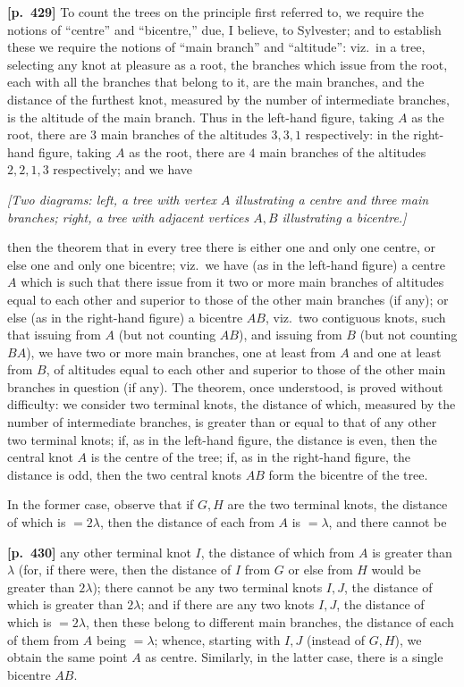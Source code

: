 \documentclass[11pt,a4paper]{article}
\begin{document}
\bigskip
\noindent\textbf{[p.~429]}\quad
To count the trees on the principle first referred to, we require the notions of ``centre'' and ``bicentre,'' due, I believe, to Sylvester; and to establish these we require the notions of ``main branch'' and ``altitude'': viz.\ in a tree, selecting any knot at pleasure as a root, the branches which issue from the root, each with all the branches that belong to it, are the main branches, and the distance of the furthest knot, measured by the number of intermediate branches, is the altitude of the main branch. Thus in the left-hand figure, taking $A$ as the root, there are $3$ main branches of the altitudes $3,3,1$ respectively: in the right-hand figure, taking $A$ as the root, there are $4$ main branches of the altitudes $2,2,1,3$ respectively; and we have

\begin{center}
\textit{[Two diagrams: left, a tree with vertex $A$ illustrating a centre and three main branches; right, a tree with adjacent vertices $A,B$ illustrating a bicentre.]}
\end{center}

then the theorem that in every tree there is either one and only one centre, or else one and only one bicentre; viz.\ we have (as in the left-hand figure) a centre $A$ which is such that there issue from it two or more main branches of altitudes equal to each other and superior to those of the other main branches (if any); or else (as in the right-hand figure) a bicentre $AB$, viz.\ two contiguous knots, such that issuing from $A$ (but not counting $AB$), and issuing from $B$ (but not counting $BA$), we have two or more main branches, one at least from $A$ and one at least from $B$, of altitudes equal to each other and superior to those of the other main branches in question (if any). The theorem, once understood, is proved without difficulty: we consider two terminal knots, the distance of which, measured by the number of intermediate branches, is greater than or equal to that of any other two terminal knots; if, as in the left-hand figure, the distance is even, then the central knot $A$ is the centre of the tree; if, as in the right-hand figure, the distance is odd, then the two central knots $AB$ form the bicentre of the tree.

In the former case, observe that if $G,H$ are the two terminal knots, the distance of which is $= 2\lambda$, then the distance of each from $A$ is $= \lambda$, and there cannot be

\bigskip
\noindent\textbf{[p.~430]}\quad
any other terminal knot $I$, the distance of which from $A$ is greater than $\lambda$ (for, if there were, then the distance of $I$ from $G$ or else from $H$ would be greater than $2\lambda$); there cannot be any two terminal knots $I,J$, the distance of which is greater than $2\lambda$; and if there are any two knots $I,J$, the distance of which is $= 2\lambda$, then these belong to different main branches, the distance of each of them from $A$ being $= \lambda$; whence, starting with $I,J$ (instead of $G,H$), we obtain the same point $A$ as centre. Similarly, in the latter case, there is a single bicentre $AB$.
\end{document}
